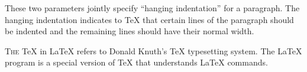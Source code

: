 \documentclass{ctexart}
\begin{document}
\hangindent=5pc 
These two parameters jointly specify
``hanging indentation'' for a paragraph.
The hanging indentation indicates to \TeX{}
that certain lines of the paragraph should
be indented and the remaining lines should
have their normal width.

\lettrine{T}{he} \TeX{} in \LaTeX{} refers
to Donald Knuth's \TeX{} typesetting system.
The \LaTeX{} program is a special version of
\TeX{} that understands \LaTeX{} commands.


\newpage

\fbox{---}\qquad
\fbox{\strut---}\qquad
\fbox{\rule{0pt}{2em}---}
\end{document}
